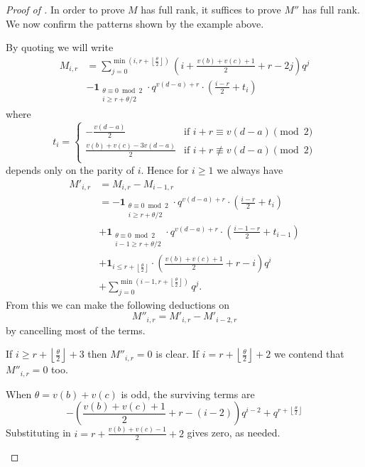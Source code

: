 \begin{proof}
  [Proof of ]
  In order to prove $M$ has full rank, it suffices to prove $M''$ has full rank.
  We now confirm the patterns shown by the example above.

  By quoting  we will write
  \begin{align*}
    M_{i,r}
    &= \sum_{j=0}^{\min(i,r + \left\lfloor \frac{\theta}{2} \right\rfloor)}
      \left( i + \frac{v(b)+v(c)+1}{2} + r - 2j \right) q^j \\
    &- \mathbf{1}_{\substack{\theta \equiv 0 \bmod 2 \\ i \ge r + \theta/2}}
      \cdot q^{v(d-a)+r} \cdot \left( \frac{i-r}{2} + t_i \right)
  \end{align*}
  where
  \[
    t_i = \begin{cases}
      -\frac{v(d-a)}{2} &\text{if } i + r \equiv v(d-a) \pmod 2 \\
      \frac{v(b)+v(c)-3v(d-a)}{2} &\text{if } i + r \not\equiv v(d-a) \pmod 2 \\
    \end{cases}
  \]
  depends only on the parity of $i$.
  Hence for $i \ge 1$ we always have
  \begin{align*}
    M'_{i,r}
    &= M_{i,r} - M_{i-1,r} \\
    &=- \mathbf{1}_{\substack{\theta \equiv 0 \bmod 2 \\ i \ge r + \theta/2}}
      \cdot q^{v(d-a)+r} \cdot \left( \frac{i-r}{2} + t_i \right) \\
    &+ \mathbf{1}_{\substack{\theta \equiv 0 \bmod 2 \\ i-1 \ge r + \theta/2}}
      \cdot q^{v(d-a)+r} \cdot \left( \frac{i-1-r}{2} + t_{i-1} \right) \\
    &+ \mathbf{1}_{i \le r + \left\lfloor \frac{\theta}{2} \right\rfloor} \cdot
      \left( \frac{v(b)+v(c)+1}{2} + r - i \right) q^i \\
    &+ \sum_{j=0}^{\min(i-1,r + \left\lfloor \frac{\theta}{2} \right\rfloor)} q^j.
  \end{align*}
  From this we can make the following deductions
  on \[ M''_{i,r} = M'_{i,r} - M'_{i-2,r} \]
  by cancelling most of the terms.
  \begin{itemize}
    \ii If $i \ge r + \left\lfloor \frac{\theta}{2} \right\rfloor + 3$
    then $M''_{i,r} = 0$ is clear.
    \ii If $i = r + \left\lfloor \frac{\theta}{2} \right\rfloor + 2$
    we contend that $M''_{i,r} = 0$ too.
    \begin{itemize}
      \ii When $\theta = v(b) + v(c)$ is odd, the surviving terms are
      \[
        - \left( \frac{v(b)+v(c)+1}{2} + r - (i-2) \right) q^{ i-2}
        + q^{r + \left\lfloor \frac{\theta}{2} \right\rfloor}
      \]
      Substituting in $i = r + \frac{v(b)+v(c)-1}{2} + 2$ gives zero, as needed.


\end{itemize}
\end{itemize}
\end{proof}
